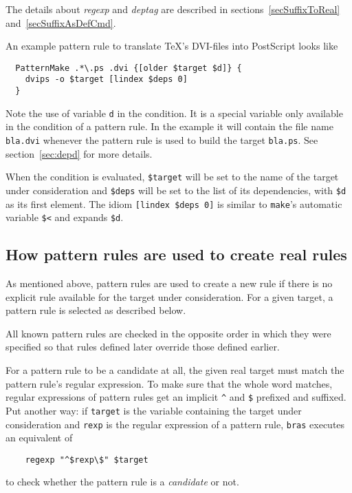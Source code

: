\documentclass[11pt]{scrartcl}
\makeatletter
\newcommand{\bras}{\texttt{bras}}
\newcommand{\make}{\texttt{make}}
\newcommand{\Indextt}[1]{\texttt{#1}\index{#1@\texttt{#1}}}
\makeatother
\begin{document}
The details about \textit{regexp} and \textit{deptag} are described
in sections~\ref{secSuffixToReal} and~\ref{secSuffixAsDefCmd}.

An example pattern rule to translate \TeX's DVI-files into PostScript
looks like
\begin{verbatim}
  PatternMake .*\.ps .dvi {[older $target $d]} {
    dvips -o $target [lindex $deps 0]
  }
\end{verbatim}
Note the use of variable \Indextt{d} in the condition. It is a special
variable only available in the condition of a pattern rule. In the
example it will contain the file name \texttt{bla.dvi} whenever the
pattern rule is used to build the target \texttt{bla.ps}. See
section~\ref{sec:depd} for more details.

When the condition is evaluated, \texttt{\$target} will be set to the
name of the target under consideration and \texttt{\$deps} will be set
to the list of its dependencies, with \texttt{\$d} as its first
element. The idiom \texttt{[lindex \$deps 0]} is similar to \make's
automatic variable \texttt{\$<} and expands \texttt{\$d}.


\subsection{How pattern rules are used to create real rules}
\label{secSuffixToReal}

As mentioned above, pattern rules are used to create a new rule if
there is no explicit rule available for the target under
consideration.  For a given target, a pattern rule is selected as
described below.

All known pattern rules are checked in the opposite order in which
they were specified so that rules defined later override those defined
earlier.

For a pattern rule to be a candidate at all, the given real target
must match the pattern rule's regular expression. To make sure that
the whole word matches, regular expressions of pattern rules get an
implicit \verb+^+ and \texttt{\$} prefixed and suffixed. Put another
way: if \texttt{target} is the variable containing the target under
consideration and \texttt{rexp} is the regular expression of a pattern
rule, \bras{} executes an equivalent of
\begin{verbatim}
    regexp "^$rexp\$" $target
\end{verbatim}
to check whether the pattern rule is a \textit{candidate} or not.
\end{document}
